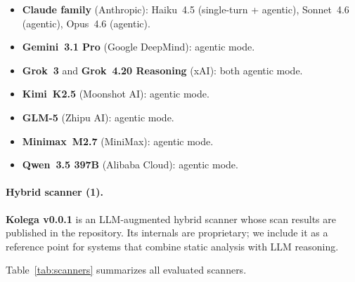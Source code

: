 \begin{itemize}
  \item \textbf{Claude family} (Anthropic): Haiku~4.5
    (single-turn + agentic), Sonnet~4.6 (agentic), Opus~4.6 (agentic).
  \item \textbf{Gemini~3.1 Pro} (Google DeepMind): agentic mode.
  \item \textbf{Grok~3} and \textbf{Grok~4.20 Reasoning} (xAI): both
    agentic mode.
  \item \textbf{Kimi~K2.5} (Moonshot AI): agentic mode.
  \item \textbf{GLM-5} (Zhipu AI): agentic mode.
  \item \textbf{Minimax~M2.7} (MiniMax): agentic mode.
  \item \textbf{Qwen~3.5 397B} (Alibaba Cloud): agentic mode.
\end{itemize}

\paragraph{Hybrid scanner (1).}
\textbf{Kolega v0.0.1} is an LLM-augmented hybrid scanner whose scan
results are published in the repository. Its internals are proprietary;
we include it as a reference point for systems that combine static
analysis with LLM reasoning.

\medskip
\noindent
Table~\ref{tab:scanners} summarizes all evaluated scanners.

